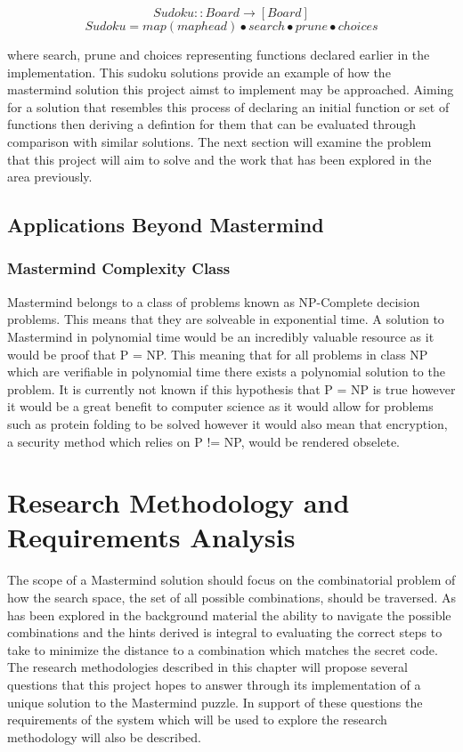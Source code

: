 \documentclass[12pt]{article}  %
\theoremstyle{definition}
\theoremstyle{remark}
\begin{document}
\[ Sudoku :: Board \rightarrow [Board]\]
\[ Sudoku = map (map head) \bullet search \bullet prune \bullet choices\]

where search, prune and choices representing functions declared earlier in the implementation. This sudoku solutions provide an example of how the mastermind solution this project aimst to implement may be approached. Aiming for a solution that resembles this process of declaring an initial function or set of functions then deriving a defintion for them that can be evaluated through comparison with similar solutions. The next section will examine the problem that this project will aim to solve and the work that has been explored in the area previously.

\subsection {Applications Beyond Mastermind}

\subsubsection {Mastermind Complexity Class}
Mastermind belongs to a class of problems known as NP-Complete decision problems. This means that they are solveable in exponential time. A solution to Mastermind in polynomial time
would be an incredibly valuable resource as it would be proof that P = NP. This meaning that for all problems in class NP which are verifiable in polynomial time there exists a polynomial
solution to the problem. It is currently not known if this hypothesis that P = NP is true however it would be a great benefit to computer science as it would allow for problems such as 
protein folding to be solved however it would also mean that encryption, a security method which relies on P != NP, would be rendered obselete.

\newpage                     %
\section{Research Methodology and Requirements Analysis}\label{ss:back}

The scope of a Mastermind solution should focus on the combinatorial problem of how the search space, the set of all possible combinations, should be traversed. As has been explored in the background material the ability to navigate the possible combinations and the hints derived is integral to evaluating the correct steps to take to minimize the distance to a combination which matches the secret code. The research methodologies described in this chapter will propose several questions that this project hopes to answer through its implementation of a unique solution to the Mastermind puzzle. In support of these questions the requirements of the system which will be used to explore the research methodology will also be described.
\end{document}
